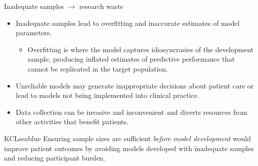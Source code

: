 \documentclass[11pt]{beamer}
\begin{document}
\begin{frame}[t]{Inadequate samples $\rightarrow$ research waste}

	\begin{itemize}
		\item Inadequate samples lead to overfitting and inaccurate estimates
		      of model parameters.
		      \begin{itemize}
			      \item Overfitting is where the model captures idiosyncrasies
			            of the development sample, producing inflated
			            estimates of predictive performance that cannot be
			            replicated in the target population.
		      \end{itemize}
		\item Unreliable models may generate inappropriate decisions about
		      patient care or lead to models not being implemented into
		      clinical practice.
		\item Data collection can be invasive and inconvenient and diverts
		      resources from other activities that benefit patients.

	\end{itemize}

	\begin{cbox}{KCLseablue}{}
		Ensuring sample sizes are sufficient \emph{before model development}
		would improve patient outcomes by avoiding models developed with
		inadequate samples and reducing participant burden.
	\end{cbox}

\end{frame}
\end{document}
